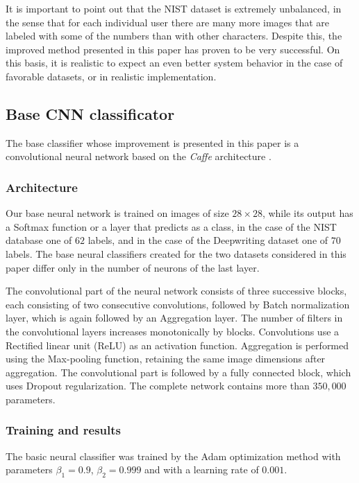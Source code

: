 \documentclass{article}
\begin{document}
It is important to point out that the NIST dataset is extremely unbalanced, in the sense that for each individual user there are many more images that are 
labeled with some of the numbers than with other characters. 
Despite this, the improved method presented in this paper has proven to be very successful. 
On this basis, it is realistic to expect an even better system behavior in the case of favorable datasets, or in realistic implementation. 

\subsection{Base CNN classificator}

The base classifier whose improvement is presented in this paper is a convolutional neural network based on the \textit{Caffe} architecture \citet{caffe}. 

\subsubsection{Architecture}

Our base neural network is trained on images of size $28 \times 28$, while its output has a Softmax function or a layer that predicts as a class, in the case of the NIST database one of $62$ labels, 
and in the case of the Deepwriting dataset one of $70$ labels. 
The base neural classifiers created for the two datasets considered in this paper differ only in the number of neurons of the last layer. 

The convolutional part of the neural network consists of three successive blocks, each consisting of two consecutive convolutions, followed by Batch normalization layer, 
which is again followed by an Aggregation layer. 
The number of filters in the convolutional layers increases monotonically by blocks. 
Convolutions use a Rectified linear unit (ReLU) as an activation function. 
Aggregation is performed using the Max-pooling function, retaining the same image dimensions after aggregation. 
The convolutional part is followed by a fully connected block, which uses Dropout regularization. 
The complete network contains more than $350,000$ parameters. 

\subsubsection{Training and results}

The basic neural classifier was trained by the Adam optimization method with parameters $\beta_1=0.9$, $\beta_2=0.999$ and with a learning rate of $0.001$. 
\end{document}
